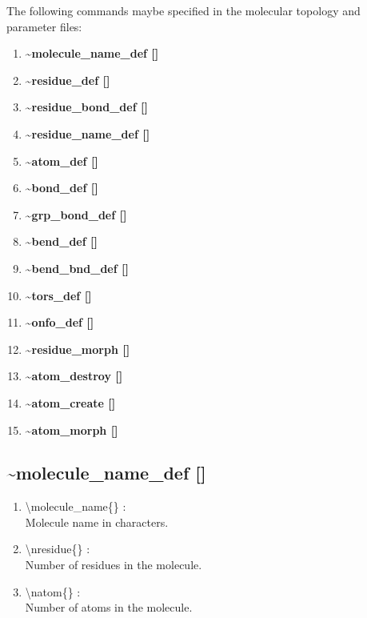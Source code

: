 \documentclass[12pt,titlepage]{article}
\begin{document}
The following commands maybe specified in the molecular topology 
and parameter files:
\begin{enumerate}
\item {\bf \~{ }molecule\_name\_def []}
\item {\bf \~{ }residue\_def []}
\item {\bf \~{ }residue\_bond\_def []}
\item {\bf \~{ }residue\_name\_def []}
\item {\bf \~{ }atom\_def []} 
\item {\bf \~{ }bond\_def []}
\item {\bf \~{ }grp\_bond\_def []}
\item {\bf \~{ }bend\_def []}
\item {\bf \~{ }bend\_bnd\_def []}
\item {\bf \~{ }tors\_def []}
\item {\bf \~{ }onfo\_def   []}   
\item {\bf \~{ }residue\_morph []}
\item {\bf \~{ }atom\_destroy []}
\item {\bf \~{ }atom\_create []}
\item {\bf \~{ }atom\_morph []}
\end{enumerate}

\newpage
\subsection*{\bf \~{ }molecule\_name\_def []}

\begin{enumerate}

 \vspace{0.15in} 
 \item  \textbackslash{}molecule\_name\{\} : \\ 
    Molecule name in characters.

 \vspace{0.15in} 
 \item  \textbackslash{}nresidue\{\} : \\ 
    Number of residues in the molecule.

 \vspace{0.15in} 
 \item  \textbackslash{}natom\{\} : \\ 
    Number of atoms in the molecule.
\end{enumerate}
\end{document}
